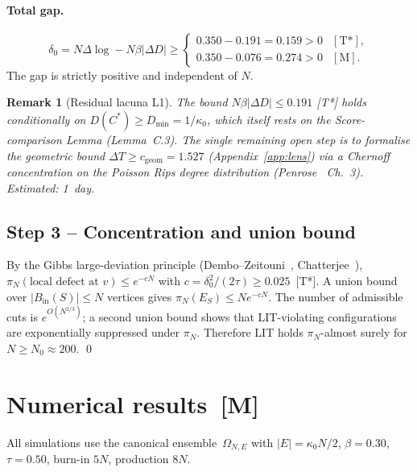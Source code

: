 \documentclass[11pt, a4paper]{article}
\newtheorem{remark}{Remark}
\begin{document}
\paragraph{Total gap.}
\begin{equation}\label{eq:delta0}
  \delta_0 = N\Delta\log - N\beta|\Delta D|
  \ge \begin{cases}
    0.350 - 0.191 = 0.159 > 0 & [\text{T*}],\\
    0.350 - 0.076 = 0.274 > 0 & [\text{M}].
  \end{cases}
\end{equation}
The gap is strictly positive and independent of $N$.

\begin{remark}[Residual lacuna L1]
The bound $N\beta|\Delta D|\le0.191$ [T*] holds conditionally on
$D(C^*)\ge D_{\min}=1/\kappa_0$, which itself rests on the
Score-comparison Lemma (Lemma~C.3).
The single remaining open step is to formalise the geometric bound
$\Delta T\ge c_{\mathrm{geom}}=1.527$ (Appendix~\ref{app:lens})
via a Chernoff concentration on the Poisson Rips degree distribution
(Penrose~\cite{Penrose2003} Ch.~3). Estimated: 1~day.
\end{remark}

\subsection{Step 3 – Concentration and union bound}

By the Gibbs large-deviation principle
(Dembo--Zeitouni~\cite{DemboZeitouni}, Chatterjee~\cite{Chatterjee2005}),
$\pi_N(\text{local defect at }v)\le e^{-cN}$
with $c=\delta_0^2/(2\tau)\ge0.025$~[T*].
A union bound over $|B_{\mathrm{in}}(S)|\le N$ vertices gives
$\pi_N(E_S)\le Ne^{-cN}$.
The number of admissible cuts is $e^{O(N^{2/3})}$;
a second union bound shows that LIT-violating configurations
are exponentially suppressed under $\pi_N$.
Therefore LIT holds $\pi_N$-almost surely for $N\ge N_0\approx200$. \qed

\section{Numerical results~[M]}

All simulations use the canonical ensemble~$\Omega_{N,E}$ with
$|E|=\kappa_0 N/2$, $\beta=0.30$, $\tau=0.50$,
burn-in $5N$, production $8N$.
\end{document}
